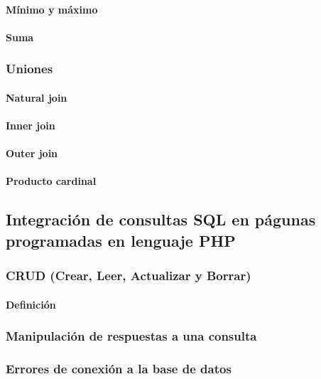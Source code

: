 \documentclass[12pt]{report}
\begin{document}
				\paragraph{Mínimo y máximo}
				\paragraph{Suma}
			\subsubsection{Uniones}
				\paragraph{Natural join}
				\paragraph{Inner join}
				\paragraph{Outer join}
				\paragraph{Producto cardinal}
		\subsection{Integración de consultas SQL en págunas programadas en lenguaje PHP}
			\subsubsection{CRUD (Crear, Leer, Actualizar y Borrar)}
				\paragraph{Definición}
			\subsubsection{Manipulación de respuestas a una consulta}
			\subsubsection{Errores de conexión a la base de datos}
\end{document}
